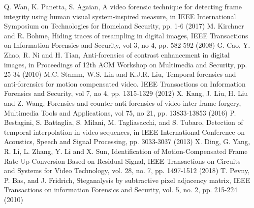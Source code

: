 \documentclass[pdftex,twocolumn,epjc3]{svjour3}          %
\begin{document}
\begin{thebibliography}{}
Q. Wan, K. Panetta, S. Agaian, A video forensic technique for detecting frame integrity using human visual system-inspired measure, in IEEE International Symposium on Technologies for Homeland Security, pp. 1-6 (2017)
 M. Kirchner and R. Bohme, Hiding traces of resampling in digital images, IEEE Transactions on Information Forensics and Security, vol 3, no 4, pp. 582-592 (2008)
G. Cao, Y. Zhao, R. Ni and H. Tian, Anti-forensics of contrast enhancement in digital images, in Proceedings of 12th ACM Workshop on Multimedia and Security, pp. 25-34 (2010)
M.C. Stamm, W.S. Lin and K.J.R. Liu, Temporal forensics and anti-forensics for motion compensated video. IEEE Transactions on Information Forensics and Security, vol 7, no 4, pp. 1315-1329 (2012)
X. Kang, J. Liu, H. Liu and Z. Wang, Forensics and counter anti-forensics of video inter-frame forgery, Multimedia Tools and Applications, vol 75, no 21, pp. 13833-13853 (2016)
P. Bestagini, S. Battaglia, S. Milani, M. Tagliasacchi, and S. Tubaro, Detection of temporal interpolation in video sequences, in IEEE International Conference on Acoustics, Speech and Signal Processing, pp. 3033-3037 (2013)
X. Ding, G. Yang, R. Li, L. Zhang, Y. Li and X. Sun, Identification of Motion-Compensated Frame Rate Up-Conversion Based on Residual Signal, IEEE Transactions on Circuits and Systems for Video Technology, vol. 28, no. 7, pp. 1497-1512 (2018)
T. Pevny, P. Bas, and J. Fridrich, Steganalysis by subtractive pixel adjacency matrix, IEEE Transactions on information Forensics and Security, vol. 5, no. 2, pp. 215-224 (2010)
\end{thebibliography}
\end{document}
